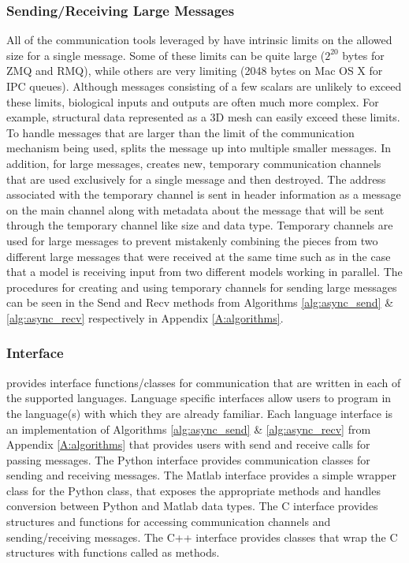 \documentclass[journal]{IEEEtran}
\newcommand{\todo}[1]{{\color{red}{#1}}}
\newcommand{\pkg}{{\tt \todo{cis\_interface}}{}}
\newcommand{\A}{Appendix{ }}
\begin{document}
\subsubsection{Sending/Receiving Large Messages}\label{SSS:large}
%
All of the communication tools leveraged by {\pkg} have intrinsic limits on the allowed size for a single message. Some of these limits can be quite large ($2^{20}$ bytes for ZMQ and RMQ), while others are very limiting (2048 bytes on Mac OS X for IPC queues). Although messages consisting of a few scalars are unlikely to exceed these limits, biological inputs and outputs are often much more complex. For example, structural data represented as a 3D mesh can easily exceed these limits. To handle messages that are larger than the limit of the communication mechanism being used, {\pkg} splits the message up into multiple smaller messages. In addition, for large messages, {\pkg} creates new, temporary communication channels that are used exclusively for a single message and then destroyed. The address associated with the temporary channel is sent in header information as a message on the main channel along with metadata about the message that will be sent through the temporary channel like size and data type. Temporary channels are used for large messages to prevent mistakenly combining the pieces from two different large messages that were received at the same time such as in the case that a model is receiving input from two different models working in parallel. The procedures for creating and using temporary channels for sending large messages can be seen in the {\sc Send} and {\sc Recv} methods from Algorithms \ref{alg:async_send} \& \ref{alg:async_recv} respectively in \A\ref{A:algorithms}.


\subsubsection{Interface}\label{SSS:interface}
%
{\pkg} provides interface functions/classes for communication that are written in each of the supported languages. Language specific interfaces allow users to program in the language(s) with which they are already familiar.  Each language interface is an implementation of Algorithms \ref{alg:async_send} \& \ref{alg:async_recv} from \A\ref{A:algorithms} that provides users with send and receive calls for passing messages. The Python interface provides communication classes for sending and receiving messages. The Matlab interface provides a simple wrapper class for the Python class, that exposes the appropriate methods and handles conversion between Python and Matlab data types. The C interface provides structures and functions for accessing communication channels and sending/receiving messages. The C++ interface provides classes that wrap the C structures with functions called as methods.
\end{document}
